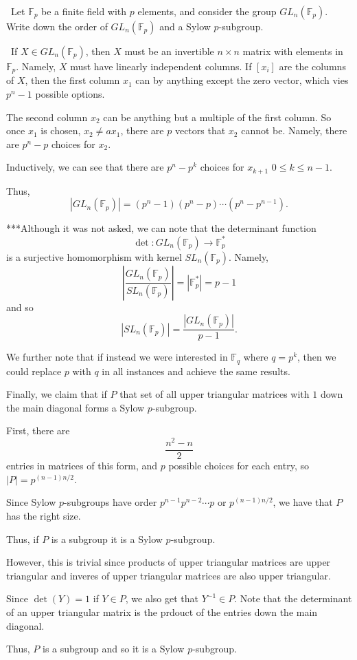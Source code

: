 \documentclass[12pt]{AlgebraQual}
\begin{document}
\begin{problem} $\,$
Let $\mathbb{F}_p$ be a finite field with $p$ elements, and consider the group $GL_n(\mathbb{F}_p)$. Write down the order of $GL_n(\mathbb{F}_p)$ and a Sylow $p$-subgroup.
\end{problem}


\begin{solution}$\,$
If $X\in GL_n(\mathbb{F}_p)$, then $X$ must be an invertible $n\times n$ matrix with elements in $\mathbb{F}_p$. Namely, $X$ must have linearly independent columns. If $[x_i]$ are the columns of $X$, then the first column $x_1$ can by anything except the zero vector, which vies $p^n-1$ possible options.

The second column $x_2$ can be anything but a multiple of the first column. So once $x_1$ is chosen, $x_2\not=ax_1$, there are $p$ vectors that $x_2$ cannot be. Namely, there are $p^n-p$ choices for $x_2$.

Inductively, we can see that there are $p^n-p^k$ choices for $x_{k+1}$ $0\le k\le n-1$.

Thus, $$|GL_n(\mathbb{F}_p)|=(p^n-1)(p^n-p)\cdots(p^n-p^{n-1}).$$

\begin{mybox}
***Although it was not asked, we can note that the determinant function $$\det:GL_n(\mathbb{F}_p)\to\mathbb{F}_p^*$$ is a surjective homomorphism with kernel $SL_n(\mathbb{F}_p)$. Namely, $$\left|\frac{GL_n(\mathbb{F}_p)}{SL_n(\mathbb{F}_p)}\right|=|\mathbb{F}_p^*|=p-1$$ and so $$|SL_n(\mathbb{F}_p)|=\frac{|GL_n(\mathbb{F}_p)|}{p-1}.$$

We further note that if instead we were interested in $\mathbb{F}_q$ where $q=p^k$, then we could replace $p$ with $q$ in all instances and achieve the same results.
\end{mybox}

Finally, we claim that if $P$ that set of all upper triangular matrices with $1$ down the main diagonal forms a Sylow $p$-subgroup.

First, there are $$\frac{n^2-n}{2}$$ entries in matrices of this form, and $p$ possible choices for each entry, so $|P|=p^{(n-1)n/2}$.

Since Sylow $p$-subgroups have order $p^{n-1}p^{n-2}\cdots p$ or $p^{(n-1)n/2}$, we have that $P$ has the right size.

Thus, if $P$ is a subgroup it is a Sylow $p$-subgroup.

However, this is trivial since products of upper triangular matrices are upper triangular and inveres of upper triangular matrices are also upper triangular.

Since $\det(Y)=1$ if $Y\in P$, we also get that $Y^{-1}\in P$. Note that the determinant of an upper triangular matrix is the prdouct of the entries down the main diagonal.

Thus, $P$ is a subgroup and so it is a Sylow $p$-subgroup.
\end{solution}
\newpage
\end{document}
